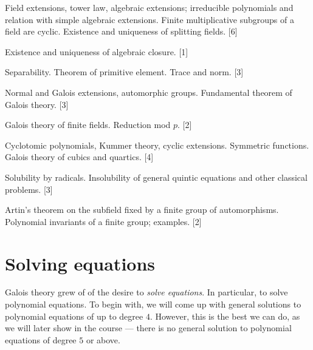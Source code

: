 \documentclass[a4paper]{article}
\begin{document}
\maketitle
{\small
\noindent Field extensions, tower law, algebraic extensions; irreducible polynomials and relation with simple algebraic extensions. Finite multiplicative subgroups of a field are cyclic. Existence and uniqueness of splitting fields.\hspace*{\fill} [6]

\vspace{5pt}
\noindent Existence and uniqueness of algebraic closure.\hspace*{\fill} [1]

\vspace{5pt}
\noindent Separability. Theorem of primitive element. Trace and norm.\hspace*{\fill} [3]

\vspace{5pt}
\noindent Normal and Galois extensions, automorphic groups. Fundamental theorem of Galois theory.\hspace*{\fill} [3]

\vspace{5pt}
\noindent Galois theory of finite fields. Reduction mod $p$.\hspace*{\fill} [2]

\vspace{5pt}
\noindent Cyclotomic polynomials, Kummer theory, cyclic extensions. Symmetric functions. Galois theory of cubics and quartics.\hspace*{\fill} [4]

\vspace{5pt}
\noindent Solubility by radicals. Insolubility of general quintic equations and other classical problems.\hspace*{\fill} [3]

\vspace{5pt}
\noindent Artin's theorem on the subfield fixed by a finite group of automorphisms. Polynomial invariants of a finite group; examples.\hspace*{\fill} [2]}

\tableofcontents

\section{Solving equations}
Galois theory grew of of the desire to \emph{solve equations}. In particular, to solve polynomial equations. To begin with, we will come up with general solutions to polynomial equations of up to degree $4$. However, this is the best we can do, as we will later show in the course --- there is no general solution to polynomial equations of degree $5$ or above.
\end{document}
